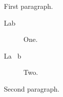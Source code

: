 \documentclass{article}
\begin{document}
First paragraph.
\begin{description}\item[Lab] One. \item[La \lxmbf\ b] Two.\end{description}
Second paragraph.
\end{document}
